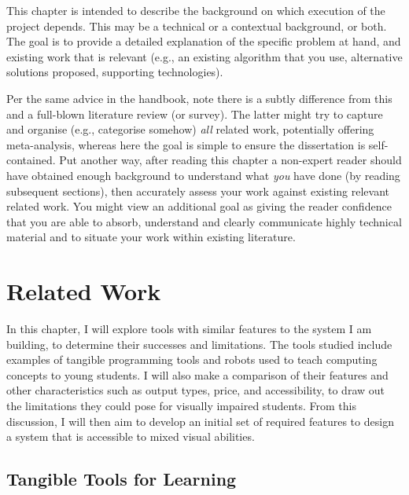 \documentclass[oneside,%
                    author={Malak Hajji},
                    degree={BSc},
                    title={Designing An Accessible Computational Toolkit For Students},
                  subtitle={With Mixed Visual Abilities}]{dissertation}
\begin{document}
\noindent
This chapter is intended to describe the background on which execution of the project depends. This may be a technical or a contextual background, or both. The goal is to provide a detailed explanation of the specific problem at hand, and existing work that is relevant (e.g., an existing algorithm that you use, alternative solutions proposed, supporting technologies).  

Per the same advice in the handbook, note there is a subtly difference from this and a full-blown literature review (or survey).  The latter might try to capture and organise (e.g., categorise somehow) \emph{all} related work, potentially offering meta-analysis, whereas here the goal is simple to ensure the dissertation is self-contained.  Put another way, after reading this chapter a non-expert reader should have obtained enough background to understand what \emph{you} have done (by reading subsequent sections), then accurately assess your work against existing relevant related work.  You might view an additional goal as giving the reader confidence that you are able to absorb, understand and clearly communicate highly technical material and to situate your work within existing literature.



\chapter{Related Work}
\label{chap:execution}
In this chapter, I will explore tools with similar features to the system I am building, to determine their successes and limitations. The tools studied include examples of tangible programming tools and robots used to teach computing concepts to young students. I will also make a comparison of their features and other characteristics such as output types, price, and accessibility, to draw out the limitations they could pose for visually impaired students. From this discussion, I will then aim to develop an initial set of required features to design a system that is accessible to mixed visual abilities.

\section{Tangible Tools for Learning}
\end{document}
